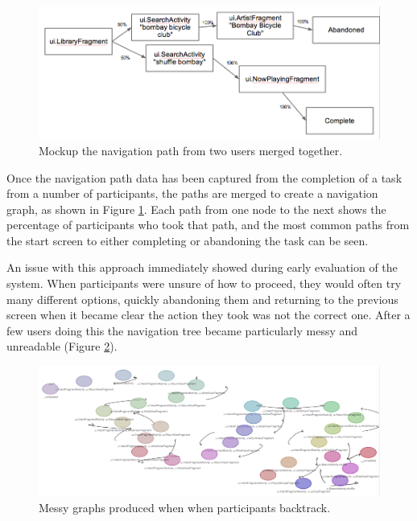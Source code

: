 \begin{figure}[h]
 \centering
 \includegraphics[width=\textwidth]{images/merged-paths}
 \caption{Mockup the navigation path from two users merged together.}
 \label{fig:task-navigation-tree}
\end{figure}

Once the navigation path data has been captured from the completion of a task from a number of participants, the paths are merged to create a navigation graph, as shown in Figure \ref{fig:task-navigation-tree}. Each path from one node to the next shows the percentage of participants who took that path, and the most
common paths from the start screen to either completing or abandoning the task can be seen.

An issue with this approach immediately showed during early evaluation of the system. When participants were unsure of how to proceed, they would often try many different options, quickly abandoning them and returning to the previous screen when it became clear the action they took was not the correct one.
After a few users doing this the navigation tree became particularly messy and unreadable 
(Figure \ref{fig:task-navigation-mess}).

\begin{figure}[h]
 \centering
 \includegraphics[width=\textwidth]{images/messy-graph}
 \caption{Messy graphs produced when when participants backtrack.}
 \label{fig:task-navigation-mess}
\end{figure}

